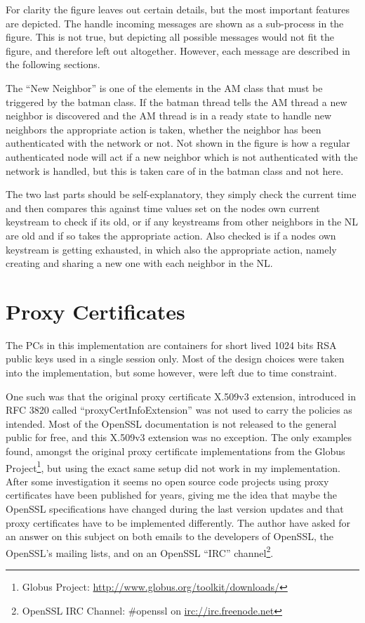 For clarity the figure leaves out certain details, but the most important
features are depicted. The handle incoming messages are shown as a sub-process
in the figure.  This is not true, but depicting all possible messages would not
fit the figure, and therefore left out altogether. However, each message are
described in the following sections.

The ``New Neighbor'' is one of the elements in the AM class that must be
triggered by the batman class. If the batman thread tells the AM thread a new
neighbor is discovered and the AM thread is in a ready state to handle new
neighbors the appropriate action is taken, whether the neighbor has been
authenticated with the network or not. Not shown in the figure is how a regular
authenticated node will act if a new neighbor which is not authenticated with
the network is handled, but this is taken care of in the batman class and not
here.

The two last parts should be self-explanatory, they simply check the current
time and then compares this against time values set on the nodes own current
keystream to check if its old, or if any keystreams from other neighbors in the
\ac{NL} are old and if so takes the appropriate action. Also checked is if a
nodes own keystream is getting exhausted, in which also the appropriate action,
namely creating and sharing a new one with each neighbor in the \ac{NL}.


\section{Proxy Certificates}
The \acp{PC} in this implementation are containers for short lived 1024 bits RSA
public keys used in a single session only. Most of the design choices were taken
into the implementation, but some however, were left due to time constraint.

One such was that the original proxy certificate X.509v3 extension, introduced
in RFC 3820 called ``proxyCertInfoExtension'' was not used to carry the policies as
intended. Most of the OpenSSL documentation is not released to the general
public for free, and this X.509v3 extension was no exception. The only examples
found, amongst the original proxy certificate implementations from the Globus
Project\footnote{Globus Project:
\url{http://www.globus.org/toolkit/downloads/}}, but using the exact same setup
did not work in my implementation. After some investigation it seems no open
source code projects using proxy certificates have been published for years,
giving me the idea that maybe the OpenSSL specifications have changed during
the last version updates and that proxy certificates have to be implemented
differently. The author have asked for an answer on this subject on both emails
to the developers of OpenSSL, the OpenSSL's mailing lists, and on an
OpenSSL ``IRC'' channel\footnote{OpenSSL IRC Channel: \#openssl on
\url{irc://irc.freenode.net}}.

